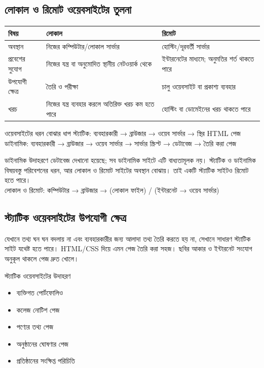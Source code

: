 \subsection{লোকাল ও রিমোট ওয়েবসাইটের তুলনা}
\begin{center}
\begin{tabular}{|p{}|p{}|p{}|}
\hline
\textbf{বিষয়} & \textbf{লোকাল} & \textbf{রিমোট} \\
\hline
অবস্থান & নিজের কম্পিউটার/লোকাল সার্ভার & হোস্টিং/দূরবর্তী সার্ভার \\
\hline
প্রবেশের সুযোগ & নিজের যন্ত্র বা অনুমোদিত স্থানীয় নেটওয়ার্ক থেকে & ইন্টারনেটের মাধ্যমে; অনুমতির শর্ত থাকতে পারে \\
\hline
উপযোগী ক্ষেত্র & তৈরি ও পরীক্ষা & চালু ওয়েবসাইট বা প্রকাশ্য ব্যবহার \\
\hline
খরচ & নিজের যন্ত্র ব্যবহার করলে অতিরিক্ত খরচ কম হতে পারে & হোস্টিং বা ডোমেইনের খরচ থাকতে পারে \\
\hline
\end{tabular}
\end{center}

\begin{examplebox}{ওয়েবসাইটের ধরন বোঝার ধাপ}
স্ট্যাটিক: ব্যবহারকারী → ব্রাউজার → ওয়েব সার্ভার → স্থির HTML পেজ \\
ডাইনামিক: ব্যবহারকারী → ব্রাউজার → ওয়েব সার্ভার → সার্ভার স্ক্রিপ্ট → ডেটাবেজ → তৈরি করা পেজ

ডাইনামিক উদাহরণে ডেটাবেজ দেখানো হয়েছে; সব ডাইনামিক সাইটে এটি বাধ্যতামূলক নয়। স্ট্যাটিক ও ডাইনামিক বিষয়বস্তু পরিবেশনের ধরন, আর লোকাল ও রিমোট সাইটের অবস্থান বোঝায়। তাই একটি স্ট্যাটিক সাইটও রিমোট হতে পারে। \\
লোকাল ও রিমোট: কম্পিউটার → ব্রাউজার → (লোকাল ফাইল) / (ইন্টারনেট → ওয়েব সার্ভার)
\end{examplebox}

\subsection{স্ট্যাটিক ওয়েবসাইটের উপযোগী ক্ষেত্র}

যেখানে তথ্য ঘন ঘন বদলায় না এবং ব্যবহারকারীর জন্য আলাদা তথ্য তৈরি করতে হয় না, সেখানে সাধারণ স্ট্যাটিক সাইট যথেষ্ট হতে পারে। HTML/CSS দিয়ে এমন পেজ তৈরি করা সহজ। ছবির আকার ও ইন্টারনেট সংযোগ অনুকূল থাকলে পেজ দ্রুত খোলে।

\begin{examplebox}{স্ট্যাটিক ওয়েবসাইটের উদাহরণ}
\begin{itemize}
\item ব্যক্তিগত পোর্টফোলিও
\item কলেজ নোটিশ পেজ
\item পণ্যের তথ্য পেজ
\item অনুষ্ঠানের ঘোষণার পেজ
\item প্রতিষ্ঠানের সংক্ষিপ্ত পরিচিতি
\end{itemize}
\end{examplebox}

